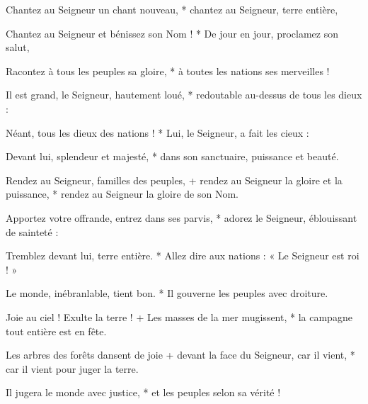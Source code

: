 \item Chantez au Seigneur un chant nouveau, * chantez au Seigneur, terre entière,
\item Chantez au Seigneur et bénissez son Nom ! * De jour en jour, proclamez son salut,
\item Racontez à tous les peuples sa gloire, * à toutes les nations ses merveilles !
\item Il est grand, le Seigneur, hautement loué, * redoutable au-dessus de tous les dieux :
\item Néant, tous les dieux des nations ! * Lui, le Seigneur, a fait les cieux :
\item Devant lui, splendeur et majesté, * dans son sanctuaire, puissance et beauté.
\item Rendez au Seigneur, familles des peuples, + rendez au Seigneur la gloire et la puissance, * rendez au Seigneur la gloire de son Nom. 
\item Apportez votre offrande, entrez dans ses parvis, * adorez le Seigneur, éblouissant de sainteté : 
\item Tremblez devant lui, terre entière. * Allez dire aux nations : « Le Seigneur est roi ! » 
\item Le monde, inébranlable, tient bon. * Il gouverne les peuples avec droiture.
\item Joie au ciel ! Exulte la terre ! + Les masses de la mer mugissent, * la campagne tout entière est en fête. 
\item Les arbres des forêts dansent de joie + devant la face du Seigneur, car il vient, * car il vient pour juger la terre. 
\item Il jugera le monde avec justice, * et les peuples selon sa vérité !
